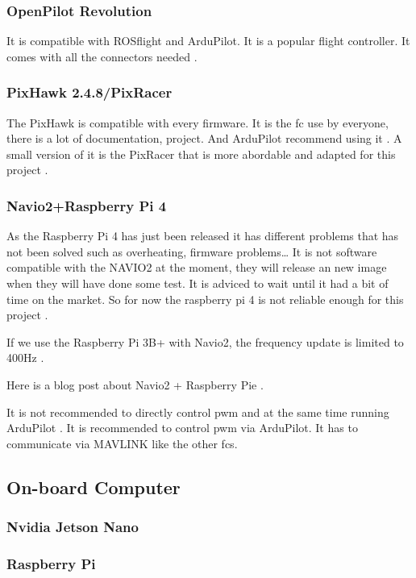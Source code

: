 \subsubsection{OpenPilot Revolution}
It is compatible with ROSflight and ArduPilot. It is a popular flight controller.
It comes with all the connectors needed \cite{bangood_revo}.


\subsubsection{PixHawk 2.4.8/PixRacer}
The PixHawk is compatible with every firmware.
It is the \gls{fc} use by everyone, there is a lot of documentation, project. And ArduPilot recommend using it \cite{ardupilot_choose_fc}.
A small version of it is the PixRacer that is more abordable and adapted for this project \cite{mrobotics_pixracer}.

\subsubsection{Navio2+Raspberry Pi 4}
As the Raspberry Pi 4 has just been released it has different problems that has not been solved such as overheating, firmware problems… It is not software compatible with the NAVIO2 at the moment, they will release an new image when they will have done some test. It is adviced to wait until it had a bit of time on the market. So for now the raspberry pi 4 is not reliable enough for this project \cite{ardupilot_rpi_compatibility}.

If we use the Raspberry Pi 3B+ with Navio2, the frequency update is limited to 400Hz \cite{emlid_pwm_frequency}.

Here is a blog post about Navio2 + Raspberry Pie \cite{dojofordrones_rpi_drone}.

It is not recommended to directly control pwm and at the same time running ArduPilot \cite{emlid_servo_control}. It is recommended to control pwm via ArduPilot. It has to communicate via MAVLINK like the other \glspl{fc}.

\subsection{On-board Computer}
\subsubsection{Nvidia Jetson Nano}

\subsubsection{Raspberry Pi}

